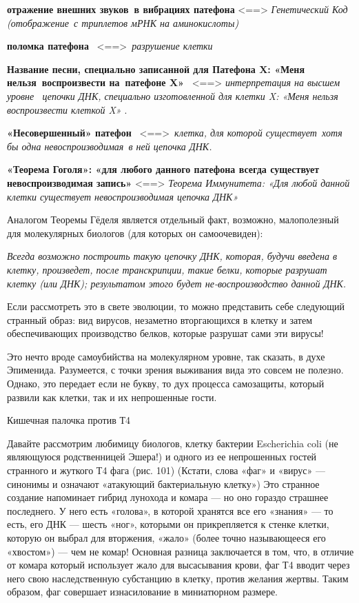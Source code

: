 \textbf{отражение внешних звуков~в вибрациях патефона} \textless==\textgreater{} \emph{Генетический Код (отображение~с триплетов мРНК на аминокислоты)}

\textbf{поломка патефона} ~\textless==\textgreater~\emph{разрушение клетки}

\textbf{Название песни, специально записанной для Патефона X: «Меня нельзя~воспроизвести на~патефоне X»} ~\textless==\textgreater{} \emph{интерпретация на высшем уровне ~цепочки ДНК, специально изготовленной для клетки X: «Меня нельзя воспроизвести клеткой X»} .

\textbf{«Несовершенный» патефон} ~\textless==\textgreater~\emph{клетка, для которой существует~хотя бы одна невоспроизводимая~в ней цепочка ДНК.}

\textbf{«Теорема Гоголя»: «для любого данного патефона всегда существует невоспроизводимая запись»} \textless==\textgreater{} \emph{Теорема Иммунитета: «Для любой данной клетки существует невоспроизводимая цепочка ДНК»}

Аналогом Теоремы Гёделя является отдельный факт, возможно, малополезный для молекулярных биологов (для которых он самоочевиден):

\emph{Всегда возможно построить такую цепочку ДНК, которая, будучи введена в клетку, произведет, после транскрипции, такие белки, которые разрушат клетку (или ДНК); результатом этого будет не-воспроизводство данной ДНК.}

Если рассмотреть это в свете эволюции, то можно представить себе следующий странный образ: вид вирусов, незаметно вторгающихся в клетку и затем обеспечивающих производство белков, которые разрушат сами эти вирусы!

Это нечто вроде самоубийства на молекулярном уровне, так сказать, в духе Эпименида. Разумеется, с точки зрения выживания вида это совсем не полезно. Однако, это передает если не букву, то дух процесса самозащиты, который развили как клетки, так и их непрошенные гости.

Кишечная палочка против Т4

Давайте рассмотрим любимицу биологов, клетку бактерии Escherichia coli (не являющуюся родственницей Эшера!) и одного из ее непрошенных гостей странного и жуткого Т4 фага (рис. 101) (Кстати, слова «фаг» и «вирус» --- синонимы и означают «атакующий бактериальную клетку») Это странное создание напоминает гибрид лунохода и комара --- но оно гораздо страшнее последнего. У него есть «голова», в которой хранятся все его «знания» --- то есть, его ДНК --- шесть «ног», которыми он прикрепляется к стенке клетки, которую он выбрал для вторжения, «жало» (более точно называющееся его «хвостом») --- чем не комар! Основная разница заключается в том, что, в отличие от комара который использует жало для высасывания крови, фаг Т4 вводит через него свою наследственную субстанцию в клетку, против желания жертвы. Таким образом, фаг совершает изнасилование в миниатюрном размере.

